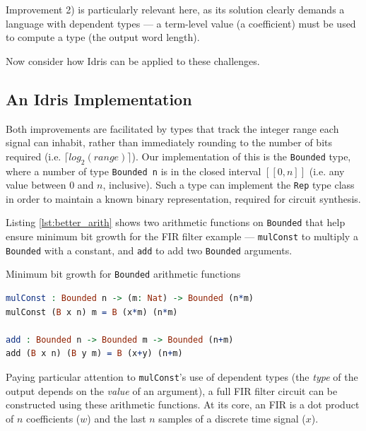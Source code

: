 \documentclass[conference]{IEEEtran}
\begin{document}
Improvement 2) is particularly relevant here, as its solution clearly demands a
language with dependent types --- a term-level value (a coefficient) must be
used to compute a type (the output word length).


Now consider how Idris can be applied to these challenges.

\subsection{An Idris Implementation}

Both improvements are facilitated by types that track the integer range each
signal can inhabit, rather than immediately rounding to the number of bits
required (i.e. $\lceil log_2(range) \rceil$). Our implementation of this is the
\texttt{Bounded} type, where a number of type \texttt{Bounded n} is in the
closed interval $[\![0,n]\!]$ (i.e. any value between 0 and $n$, inclusive).
Such a type can implement the \texttt{Rep} type class in order to maintain a
known binary representation, required for circuit synthesis.

Listing \ref{lst:better_arith} shows two arithmetic functions on
\texttt{Bounded} that help ensure minimum bit growth for the FIR filter example
--- \texttt{mulConst} to multiply a \texttt{Bounded} with a constant, and
\texttt{add} to add two \texttt{Bounded} arguments.

\begin{codefig}[h]
  \caption{Minimum bit growth for \texttt{Bounded} arithmetic functions}
\begin{lstlisting}[language=idris]
mulConst : Bounded n -> (m: Nat) -> Bounded (n*m)
mulConst (B x n) m = B (x*m) (n*m)

add : Bounded n -> Bounded m -> Bounded (n+m)
add (B x n) (B y m) = B (x+y) (n+m)
\end{lstlisting}
\label{lst:better_arith}
\end{codefig}

Paying particular attention to \texttt{mulConst}'s use of dependent types (the
\emph{type} of the output depends on the \emph{value} of an argument), a full
FIR filter circuit can be constructed using these arithmetic functions. At its
core, an FIR is a dot product of $n$ coefficients ($w$) and the last $n$ samples
of a discrete time signal ($x$).
\end{document}
